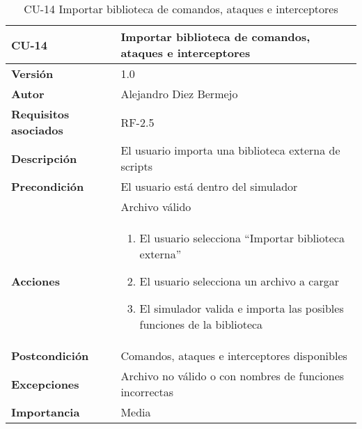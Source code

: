 \begin{table}[p]
	\centering
	\begin{tabularx}{\linewidth}{ p{} p{} }
		\toprule
		\textbf{CU-14}    & \textbf{Importar biblioteca de comandos, ataques e interceptores}\\
		\toprule
		\textbf{Versión}              & 1.0    \\
		\textbf{Autor}                & Alejandro Diez Bermejo \\
		\textbf{Requisitos asociados} & RF-2.5 \\
		\textbf{Descripción}          & El usuario importa una biblioteca externa de scripts \\
        \textbf{Precondición}         & El usuario está dentro del simulador \\
                                      & Archivo válido \\
		\textbf{Acciones}             &
		\begin{enumerate}
			\def\labelenumi{\arabic{enumi}.}
			\tightlist
			\item El usuario selecciona ``Importar biblioteca externa''
            \item El usuario selecciona un archivo a cargar
            \item El simulador valida e importa las posibles funciones de la biblioteca
		\end{enumerate}\\
		\textbf{Postcondición}        & Comandos, ataques e interceptores disponibles \\
		\textbf{Excepciones}          & Archivo no válido o con nombres de funciones incorrectas \\
		\textbf{Importancia}          & Media \\
		\bottomrule
	\end{tabularx}
	\caption{CU-14 Importar biblioteca de comandos, ataques e interceptores}
\end{table}

